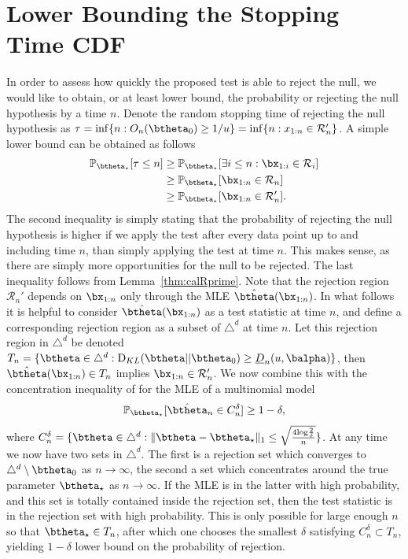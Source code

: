 \documentclass[11pt]{article}
\def\log{{\rm log}}
\newcommand{\KL}{\mathrm{D}_{KL}}
\begin{document}
\section{Lower Bounding the Stopping Time CDF}
\label{app:finite_sample}
In order to assess how quickly the proposed test is able to reject the null, we would like to obtain, or at least lower bound, the probability
or rejecting the null hypothesis by a time $n$. Denote the random stopping time of rejecting the null hypothesis as $\tau = \inf \{n : O_n(\btheta_0) \geq 1/u\} =\inf \{n : x_{1:n} \in \mathcal{R}'_n\}$. 
A simple lower bound can be obtained as follows
\begin{align*}
  \mathbb{P}_{\btheta_\star}[\tau \leq n] &\geq \mathbb{P}_{\btheta_\star}[\exists i \leq n : \bx_{1:i} \in \mathcal{R}_i]\\ 
&\geq \mathbb{P}_{\btheta_\star}[\bx_{1:n} \in \mathcal{R}_n]\\ 
&\geq \mathbb{P}_{\btheta_\star}[\bx_{1:n} \in \mathcal{R}'_n].\\ 
\end{align*}
The second inequality is simply stating that the probability of rejecting the null hypothesis is higher if
we apply the test after every data point up to and including time $n$, than simply applying the test at time $n$.
This makes sense, as there are simply more opportunities for the null to be rejected. 
The last inequality follows from Lemma~\ref{thm:calRprime}.
Note that the rejection region $\mathcal{R}_n'$ depends on $\bx_{1:n}$ only through the MLE $\hat{\btheta}(\bx_{1:n})$.
In what follows it is helpful to consider $\hat{\btheta}(\bx_{1:n})$ as a test statistic at time $n$,
and define a corresponding rejection region as a subset of $\triangle^d$ at time $n$.
Let this rejection region in $\triangle^d$ be denoted $T_n = \{\btheta \in \triangle^d : \KL(\btheta||\btheta_0) \geq \underline{D}_n(u,\balpha)\}$, then $\hat{\btheta}(\bx_{1:n})\in T_n$ implies
$\bx_{1:n} \in \mathcal{R}'_n$.
We now combine this with the concentration inequality of \cite{weissman2003inequalities} for the MLE of a multinomial model
\begin{align*}
  \mathbb{P}_{\btheta_\star}[\hat{\btheta}_n \in C_n^\delta] \geq 1 - \delta,
\end{align*}
where $C_n^\delta = \{ \btheta \in \triangle^d : \|\btheta-\btheta_\star\|_1 \leq \sqrt{\frac{4\log \frac{2}{\delta}}{n}}\}$.
At any time we now have two sets in $\triangle^d$. 
The first is a rejection set which converges to  $\triangle^d \setminus \btheta_0$ as $n \rightarrow \infty$,
the second a set which concentrates around the true parameter $\btheta_\star$ as $n \rightarrow \infty$.
If the MLE is in the latter with high probability, and this set is totally contained inside the rejection set, then the test statistic is in the rejection set with high probability. 
This is only possible for large enough $n$ so that $\btheta_\star \in T_n$, after which one chooses the smallest $\delta$ satisfying $C_n^\delta \subset T_n$, yielding $1-\delta$ lower bound on the probability of rejection.
\end{document}
